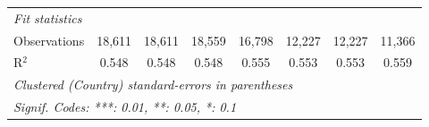 \begin{tabular}{lccccccc}
   \midrule \emph{Fit statistics}\\
   Observations                                                                         & 18,611  & 18,611  & 18,559  & 16,798  & 12,227        & 12,227        & 11,366\\  
   R$^2$                                                                                & 0.548   & 0.548   & 0.548   & 0.555   & 0.553         & 0.553         & 0.559\\  
   \midrule
   \multicolumn{8}{l}{\emph{Clustered (Country) standard-errors in parentheses}}\\
   \multicolumn{8}{l}{\emph{Signif. Codes: ***: 0.01, **: 0.05, *: 0.1}}\\
\end{tabular}
\par\endgroup


